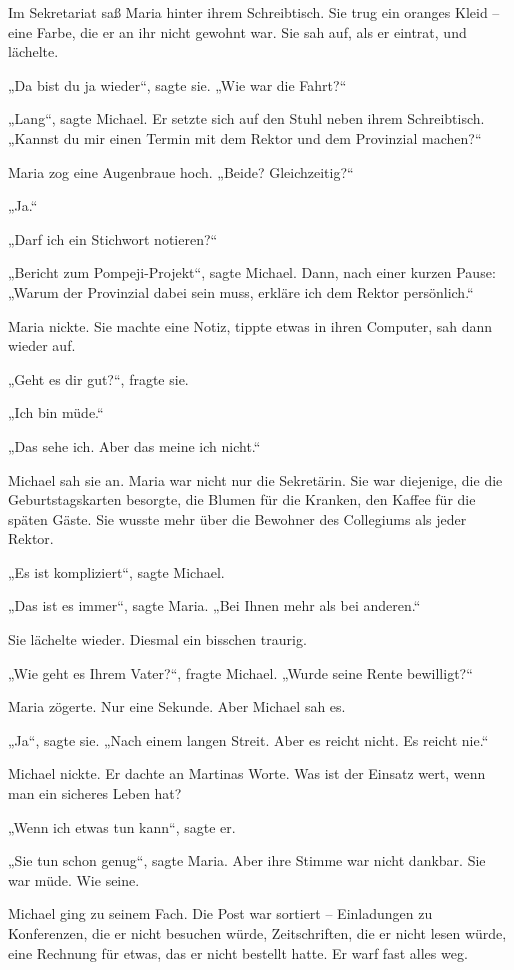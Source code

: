 \documentclass[
]{article}
\begin{document}
Im Sekretariat saß Maria hinter ihrem Schreibtisch. Sie trug ein oranges Kleid -- eine Farbe, die er an ihr nicht gewohnt war. Sie sah auf, als er eintrat, und lächelte.

„Da bist du ja wieder``, sagte sie. „Wie war die Fahrt?{\kern0pt}``

„Lang``, sagte Michael. Er setzte sich auf den Stuhl neben ihrem Schreibtisch. „Kannst du mir einen Termin mit dem Rektor und dem Provinzial machen?{\kern0pt}``

Maria zog eine Augenbraue hoch. „Beide? Gleichzeitig?{\kern0pt}``

„Ja.``

„Darf ich ein Stichwort notieren?{\kern0pt}``

„Bericht zum Pompeji-Projekt``, sagte Michael. Dann, nach einer kurzen Pause: „Warum der Provinzial dabei sein muss, erkläre ich dem Rektor persönlich.``

Maria nickte. Sie machte eine Notiz, tippte etwas in ihren Computer, sah dann wieder auf.

„Geht es dir gut?{\kern0pt}``, fragte sie.

„Ich bin müde.``

„Das sehe ich. Aber das meine ich nicht.``

Michael sah sie an. Maria war nicht nur die Sekretärin. Sie war diejenige, die die Geburtstagskarten besorgte, die Blumen für die Kranken, den Kaffee für die späten Gäste. Sie wusste mehr über die Bewohner des Collegiums als jeder Rektor.

„Es ist kompliziert``, sagte Michael.

„Das ist es immer``, sagte Maria. „Bei Ihnen mehr als bei anderen.``

Sie lächelte wieder. Diesmal ein bisschen traurig.

„Wie geht es Ihrem Vater?{\kern0pt}``, fragte Michael. „Wurde seine Rente bewilligt?{\kern0pt}``

Maria zögerte. Nur eine Sekunde. Aber Michael sah es.

„Ja``, sagte sie. „Nach einem langen Streit. Aber es reicht nicht. Es reicht nie.``

Michael nickte. Er dachte an Martinas Worte. Was ist der Einsatz wert, wenn man ein sicheres Leben hat?

„Wenn ich etwas tun kann``, sagte er.

„Sie tun schon genug``, sagte Maria. Aber ihre Stimme war nicht dankbar. Sie war müde. Wie seine.

Michael ging zu seinem Fach. Die Post war sortiert -- Einladungen zu Konferenzen, die er nicht besuchen würde, Zeitschriften, die er nicht lesen würde, eine Rechnung für etwas, das er nicht bestellt hatte. Er warf fast alles weg.
\end{document}
